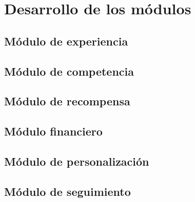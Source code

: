 
\chapter{Desarrollo de los módulos}\label{mod:concentrado}

    \section{Módulo de experiencia}\label{mod:exp}
    

    \section{Módulo de competencia}\label{mod:comp}
    

    \section{Módulo de recompensa}\label{mod:recomp}
    

    \section{Módulo financiero}\label{mod:financ}
    

    \section{Módulo de personalización}\label{mod:pers}
    


    \section{Módulo de seguimiento}\label{mod:seguim}
    

